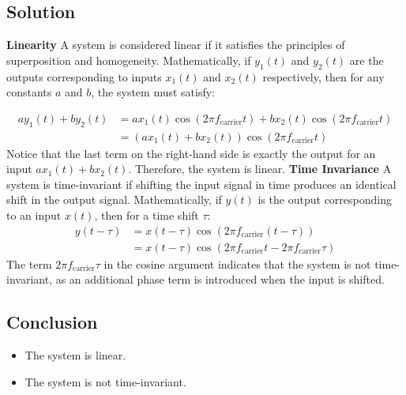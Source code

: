 \documentclass{article}
\begin{document}
\subsection*{Solution}
\textbf{Linearity}
\newline
A system is considered linear if it satisfies the principles of superposition and homogeneity. Mathematically, if \( y_1(t) \) and \( y_2(t) \) are the outputs corresponding to inputs \( x_1(t) \) and \( x_2(t) \) respectively, then for any constants \( a \) and \( b \), the system must satisfy:

\begin{align*}
a y_1(t) + b y_2(t) &= a x_1(t) \cos(2\pi f_{\text{carrier}} t) + b x_2(t) \cos(2\pi f_{\text{carrier}} t) \nonumber \\
&= (a x_1(t) + b x_2(t)) \cos(2\pi f_{\text{carrier}} t)
\end{align*}
\newline
Notice that the last term on the right-hand side is exactly the output for an input \( a x_1(t) + b x_2(t) \). Therefore, the system is linear.
\newline \newline
\textbf{Time Invariance}
\newline
A system is time-invariant if shifting the input signal in time produces an identical shift in the output signal. Mathematically, if \( y(t) \) is the output corresponding to an input \( x(t) \), then for a time shift \( \tau \):
\newline
\begin{align*}
y(t - \tau) &= x(t - \tau) \cos(2\pi f_{\text{carrier}} (t - \tau)) \\
&= x(t - \tau) \cos(2\pi f_{\text{carrier}} t - 2\pi f_{\text{carrier}} \tau)
\end{align*}
\newline
The term \( 2\pi f_{\text{carrier}} \tau \) in the cosine argument indicates that the system is not time-invariant, as an additional phase term is introduced when the input is shifted.

\subsection*{Conclusion}
\begin{itemize}
    \item The system is linear.
    \item The system is not time-invariant.
\end{itemize}
\end{document}
